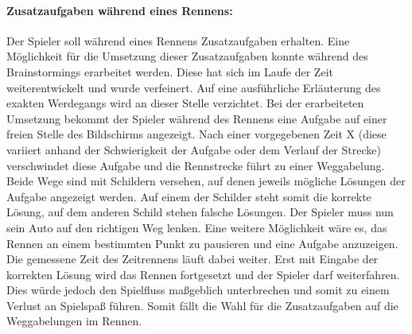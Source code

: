 		\paragraph{Zusatzaufgaben während eines Rennens:}
		Der Spieler soll während eines Rennens Zusatzaufgaben erhalten. Eine Möglichkeit für die Umsetzung dieser Zusatzaufgaben konnte während des Brainstormings erarbeitet werden. Diese hat sich im Laufe der Zeit weiterentwickelt und wurde verfeinert. Auf eine ausführliche Erläuterung des exakten Werdegangs wird an dieser Stelle verzichtet.
		Bei der erarbeiteten Umsetzung bekommt der Spieler während des Rennens eine Aufgabe auf einer freien Stelle des Bildschirms angezeigt. Nach einer vorgegebenen Zeit X (diese variiert anhand der Schwierigkeit der Aufgabe oder dem Verlauf der Strecke) verschwindet diese Aufgabe und die Rennstrecke führt zu einer Weggabelung. Beide Wege sind mit Schildern versehen, auf denen jeweils mögliche Lösungen der Aufgabe angezeigt werden. Auf einem der Schilder steht somit die korrekte Lösung, auf dem anderen Schild stehen falsche Lösungen. Der Spieler muss nun sein Auto auf den richtigen Weg lenken.
		Eine weitere Möglichkeit wäre es, das Rennen an einem bestimmten Punkt zu pausieren und eine Aufgabe anzuzeigen. Die gemessene Zeit des Zeitrennens läuft dabei weiter. Erst mit Eingabe der korrekten Lösung wird das Rennen fortgesetzt und der Spieler darf weiterfahren. Dies würde jedoch den Spielfluss maßgeblich unterbrechen und somit zu einem Verlust an Spielspaß führen. Somit fällt die Wahl für die Zusatzaufgaben auf die Weggabelungen im Rennen.

